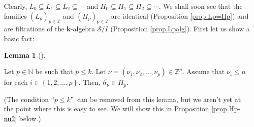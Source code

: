 \documentclass[numbers=enddot,12pt,final,onecolumn,notitlepage]{scrartcl}%
\theoremstyle{definition}
\newtheorem{lem}[theo]{Lemma}
\newenvironment{lemma}[1][]
{\begin{lem}[#1]\begin{leftbar}}
{\end{leftbar}\end{lem}}
\begin{document}
Clearly, $L_{0}\subseteq L_{1}\subseteq L_{2}\subseteq\cdots$ and
$H_{0}\subseteq H_{1}\subseteq H_{2}\subseteq\cdots$. We shall soon see that
the families $\left(  L_{p}\right)  _{p\in\mathbb{Z}}$ and $\left(
H_{p}\right)  _{p\in\mathbb{Z}}$ are identical (Proposition \ref{prop.Lp=Hp})
and are filtrations of the $\mathbf{k}$-algebra $\mathcal{S}/I$ (Proposition
\ref{prop.Lpalg}). First let us show a basic fact:

\begin{lemma}
\label{lem.Hp-nu}Let $p\in\mathbb{N}$ be such that $p\leq k$. Let $\nu=\left(
\nu_{1},\nu_{2},\ldots,\nu_{p}\right)  \in\mathbb{Z}^{p}$. Assume that
$\nu_{i}\leq n$ for each $i\in\left\{  1,2,\ldots,p\right\}  $. Then,
$\overline{h_{\nu}}\in H_{p}$.
\end{lemma}

(The condition \textquotedblleft$p\leq k$\textquotedblright\ can be removed
from this lemma, but we aren't yet at the point where this is easy to see. We
will show this in Proposition \ref{prop.Hp-nu2} below.)
\end{document}
